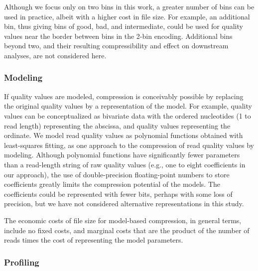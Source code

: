 \documentclass{bmcart}
\begin{document}
Although we focus only on two bins in this work, a greater number of
bins can be used in practice, albeit with a higher cost in file size.
For example, an additional bin, thus giving bins of good, bad, and
intermediate, could be used for quality values near the border between
bins in the 2-bin encoding. Additional bins beyond two, and their
resulting compressibility and effect on downstream analyses, are not
considered here.

\subsubsection*{Modeling}

If quality values are modeled, compression is conceivably possible by
replacing the original quality values by a representation of the
model. For example, quality values can be conceptualized as bivariate
data with the ordered nucleotides (1 to read length) representing the
abscissa, and quality values representing the ordinate. We model read
quality values as polynomial functions obtained with least-squares
fitting, as one approach to the compression of read quality values by
modeling. Although polynomial functions have significantly fewer
parameters than a read-length string of raw quality values (e.g., one
to eight coefficients in our approach), the use of double-precision
floating-point numbers to store coefficients greatly limits the
compression potential of the models. The coefficients could be
represented with fewer bits, perhaps with some loss of precision, but
we have not considered alternative representations in this study.

The economic costs of file size for model-based compression, in
general terms, include no fixed costs, and marginal costs that are the
product of the number of reads times the cost of representing the
model parameters.

\subsubsection*{Profiling}
\end{document}
